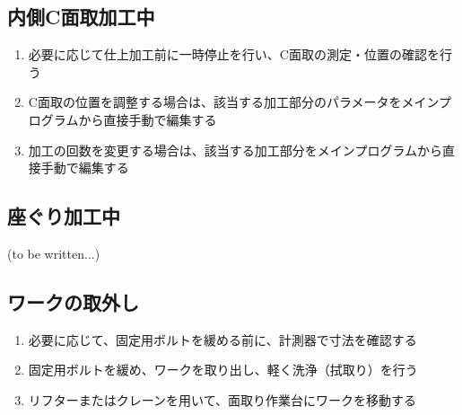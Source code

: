 \subsection{内側C面取加工中}
\begin{enumerate}
\item 必要に応じて仕上加工前に一時停止を行い、C面取の測定・位置の確認を行う
\item C面取の位置を調整する場合は、該当する加工部分のパラメータをメインプログラムから直接手動で編集する
\item 加工の回数を変更する場合は、該当する加工部分をメインプログラムから直接手動で編集する
\end{enumerate}


\clearpage
\subsection{座ぐり加工中\TBW}
(to be written...)



\clearpage


\subsection{ワークの取外し}
\begin{enumerate}
\item 必要に応じて、固定用ボルトを緩める前に、計測器で寸法を確認する
\item 固定用ボルトを緩め、ワークを取り出し、軽く洗浄（拭取り）を行う
\item リフターまたはクレーンを用いて、面取り作業台にワークを移動する
\end{enumerate}



